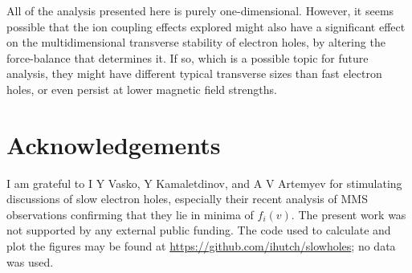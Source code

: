 \documentclass[pre]{revtex4-2}
\begin{document}
All of the analysis presented here is purely one-dimensional. However,
it seems possible that the ion coupling effects explored might also
have a significant effect on the multidimensional transverse stability
of electron holes, by altering the force-balance that determines
it\cite{Hutchinson2019}. If so, which is a possible topic for future
analysis, they might have different typical transverse sizes than fast
electron holes, or even persist at lower magnetic field strengths.

\section*{Acknowledgements}

I am grateful to I Y Vasko, Y Kamaletdinov, and A V Artemyev for
stimulating discussions of slow electron holes, especially their
recent analysis of MMS observations confirming that they lie in minima
of $f_i(v)$. The present work was not supported by any external public
funding. The code used to calculate and plot the figures may be found
at \url{https://github.com/ihutch/slowholes}; no data was used.


\end{document}

